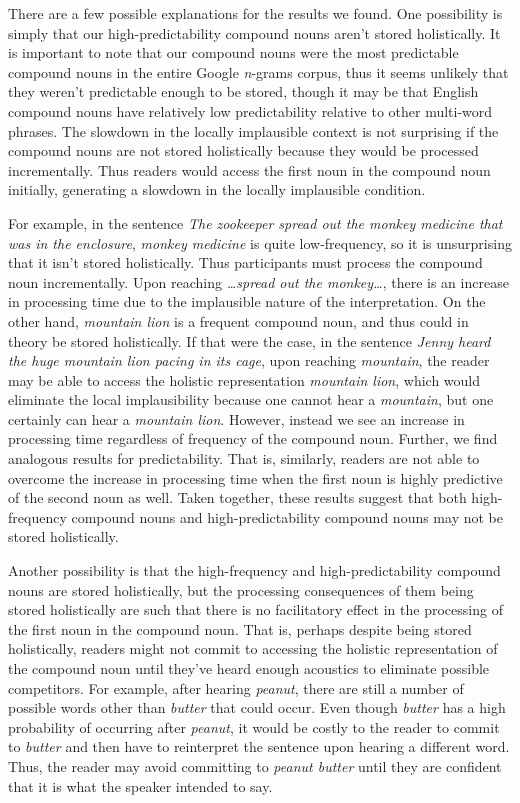 \documentclass[
  12pt,
  letterpaper,
]{scrreport}
\begin{document}
There are a few possible explanations for the results we found. One
possibility is simply that our high-predictability compound nouns aren't
stored holistically. It is important to note that our compound nouns
were the most predictable compound nouns in the entire Google
\emph{n}-grams corpus, thus it seems unlikely that they weren't
predictable enough to be stored, though it may be that English compound
nouns have relatively low predictability relative to other multi-word
phrases. The slowdown in the locally implausible context is not
surprising if the compound nouns are not stored holistically because
they would be processed incrementally. Thus readers would access the
first noun in the compound noun initially, generating a slowdown in the
locally implausible condition.

For example, in the sentence \emph{The zookeeper spread out the monkey
medicine that was in the enclosure}, \emph{monkey medicine} is quite
low-frequency, so it is unsurprising that it isn't stored holistically.
Thus participants must process the compound noun incrementally. Upon
reaching \emph{\ldots spread out the monkey\ldots{}}, there is an
increase in processing time due to the implausible nature of the
interpretation. On the other hand, \emph{mountain lion} is a frequent
compound noun, and thus could in theory be stored holistically. If that
were the case, in the sentence \emph{Jenny heard the huge mountain lion
pacing in its cage}, upon reaching \emph{mountain}, the reader may be
able to access the holistic representation \emph{mountain lion}, which
would eliminate the local implausibility because one cannot hear a
\emph{mountain}, but one certainly can hear a \emph{mountain lion}.
However, instead we see an increase in processing time regardless of
frequency of the compound noun. Further, we find analogous results for
predictability. That is, similarly, readers are not able to overcome the
increase in processing time when the first noun is highly predictive of
the second noun as well. Taken together, these results suggest that both
high-frequency compound nouns and high-predictability compound nouns may
not be stored holistically.

Another possibility is that the high-frequency and high-predictability
compound nouns are stored holistically, but the processing consequences
of them being stored holistically are such that there is no facilitatory
effect in the processing of the first noun in the compound noun. That
is, perhaps despite being stored holistically, readers might not commit
to accessing the holistic representation of the compound noun until
they've heard enough acoustics to eliminate possible competitors. For
example, after hearing \emph{peanut}, there are still a number of
possible words other than \emph{butter} that could occur. Even though
\emph{butter} has a high probability of occurring after \emph{peanut},
it would be costly to the reader to commit to \emph{butter} and then
have to reinterpret the sentence upon hearing a different word. Thus,
the reader may avoid committing to \emph{peanut butter} until they are
confident that it is what the speaker intended to say.
\end{document}
